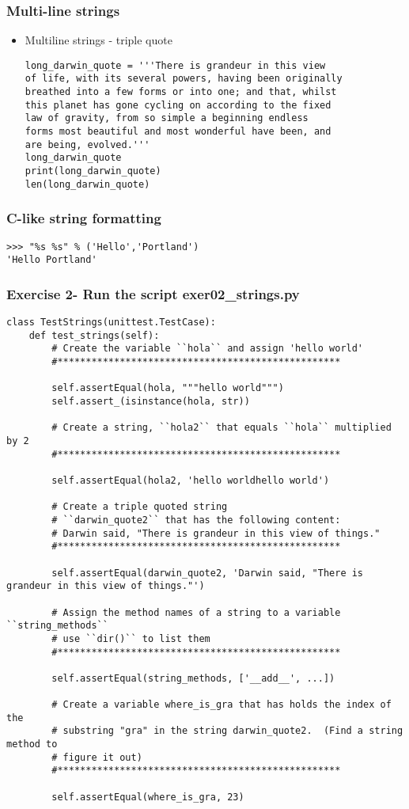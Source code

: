\documentclass{beamer}
\newcommand\Fontvi{\fontsize{6}{7.2}\selectfont}
\newcommand\Fontix{\fontsize{9}{8.3}\selectfont}
\begin{document}
\begin{frame}[fragile]
\frametitle{Multi-line strings}
\Fontix
\begin{itemize}
\item Multiline strings - triple quote
\begin{lstlisting}
long_darwin_quote = '''There is grandeur in this view
of life, with its several powers, having been originally 
breathed into a few forms or into one; and that, whilst 
this planet has gone cycling on according to the fixed 
law of gravity, from so simple a beginning endless 
forms most beautiful and most wonderful have been, and 
are being, evolved.'''
long_darwin_quote
print(long_darwin_quote)
len(long_darwin_quote)
\end{lstlisting}
\end{itemize}
\end{frame}

\begin{frame}[fragile]
\frametitle{C-like string formatting}
\begin{lstlisting}
>>> "%s %s" % ('Hello','Portland')
'Hello Portland'
\end{lstlisting}
\end{frame}

\begin{frame}[fragile]
\frametitle{Exercise 2- Run the script exer02\_strings.py}
\Fontvi
\begin{lstlisting}
class TestStrings(unittest.TestCase):
    def test_strings(self):
        # Create the variable ``hola`` and assign 'hello world'
        #**************************************************

        self.assertEqual(hola, """hello world""")
        self.assert_(isinstance(hola, str))

        # Create a string, ``hola2`` that equals ``hola`` multiplied by 2
        #**************************************************

        self.assertEqual(hola2, 'hello worldhello world')

        # Create a triple quoted string
        # ``darwin_quote2`` that has the following content:
        # Darwin said, "There is grandeur in this view of things."
        #**************************************************

        self.assertEqual(darwin_quote2, 'Darwin said, "There is grandeur in this view of things."')

        # Assign the method names of a string to a variable ``string_methods``
        # use ``dir()`` to list them
        #**************************************************

        self.assertEqual(string_methods, ['__add__', ...])

        # Create a variable where_is_gra that has holds the index of the
        # substring "gra" in the string darwin_quote2.  (Find a string method to
        # figure it out)
        #**************************************************

        self.assertEqual(where_is_gra, 23)

\end{lstlisting}
\end{frame}
\end{document}
